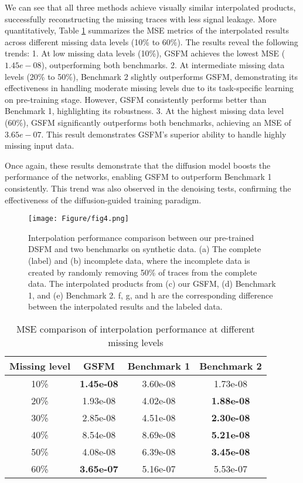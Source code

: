 We can see that all three methods achieve visually similar interpolated products, successfully reconstructing the missing traces with less signal leakage. More quantitatively, Table \ref{tab3} summarizes the MSE metrics of the interpolated results across different missing data levels (10\% to 60\%). The results reveal the following trends: 1. At low missing data levels (10\%), GSFM achieves the lowest MSE ($1.45e-08$), outperforming both benchmarks. 2. At intermediate missing data levels (20\% to 50\%), Benchmark 2 slightly outperforms GSFM, demonstrating its effectiveness in handling moderate missing levels due to its task-specific learning on pre-training stage. However, GSFM consistently performs better than Benchmark 1, highlighting its robustness. 3. At the highest missing data level (60\%), GSFM significantly outperforms both benchmarks, achieving an MSE of $3.65e-07$. This result demonstrates GSFM's superior ability to handle highly missing input data. 

Once again, these results demonstrate that the diffusion model boosts the performance of the networks, enabling GSFM to outperform Benchmark 1 consistently. This trend was also observed in the denoising tests, confirming the effectiveness of the diffusion-guided training paradigm. 

\begin{figure*}[htbp]
\centering
\texttt{[image: Figure/fig4.png]}
\caption{Interpolation performance comparison between our pre-trained DSFM and two benchmarks on synthetic data. (a) The complete (label) and (b) incomplete data, where the incomplete data is created by randomly removing 50\% of traces from the complete data. The interpolated products from (c) our GSFM, (d) Benchmark 1, and (e) Benchmark 2. f, g, and h are the corresponding difference between the interpolated results and the labeled data. }
\label{fig4}
\end{figure*}

\begin{table}[htbp]
    \centering
    \caption{MSE comparison of interpolation performance at different missing levels}
    \begin{tabular}{cccc}
        \toprule
        Missing level & GSFM & Benchmark 1 & Benchmark 2 \\
        \midrule
        10\% &   \textbf{1.45e-08} & 3.60e-08 & 1.73e-08 \\
        20\% &  1.93e-08 & 4.02e-08 & \textbf{1.88e-08} \\
        30\% &  2.85e-08 & 4.51e-08 & \textbf{2.30e-08} \\
        40\% &  8.54e-08 & 8.69e-08 & \textbf{5.21e-08} \\
        50\% &  4.08e-08 & 6.39e-08 & \textbf{3.45e-08} \\
        60\% &  \textbf{3.65e-07} & 5.16e-07 & 5.53e-07 \\
        \bottomrule
    \end{tabular}
    \label{tab3}
\end{table}

